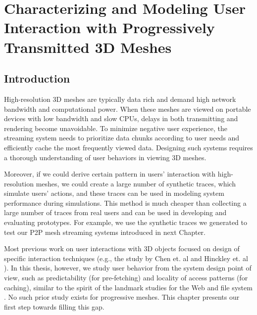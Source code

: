 \chapter{Characterizing and Modeling User Interaction with Progressively Transmitted 3D Meshes}
\label{c:user}
\section{Introduction}
High-resolution 3D meshes are typically data rich and demand high network bandwidth 
and computational power. 
When these meshes are viewed on portable devices with
low bandwidth and slow CPUs, delays in both transmitting and
rendering become unavoidable. To minimize negative user experience, the
streaming system needs to prioritize data chunks according to user needs and
efficiently cache the most frequently viewed data.  Designing such
systems requires a thorough understanding of user behaviors in viewing 3D
meshes.

Moreover, if we could derive certain pattern in users' interaction with
high-resolution meshes, we could create a large number of synthetic traces,
which simulate users' actions, and these traces can be used in modeling system
performance during simulations. This method is much cheaper than collecting 
a large number of traces from real users and can be used in developing and evaluating
prototypes. For example, we use the synthetic traces we generated to test our P2P mesh
streaming systems introduced in next Chapter.

Most previous work on user interactions with 3D objects
focused on design of specific interaction
techniques
(e.g., the study by Chen et. al \cite{chen88study} and Hinckley et. al \cite{hinckley97usability}). 
In this thesis, however, we study
user behavior from the system design point of view, 
such as predictability (for pre-fetching) and locality of access patterns (for caching),
similar to the spirit of the landmark studies for the Web \cite{huberman98web} and file system \cite{ousterhout85trace}.  
No such prior study exists for progressive meshes. This chapter presents our first step towards filling 
this gap.

